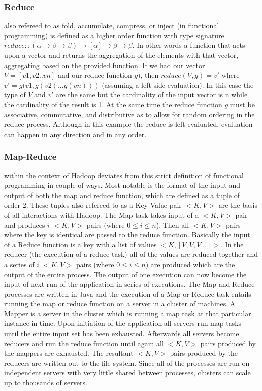 \documentclass[runningheads]{llncs}
\begin{document}
\subsubsection{Reduce}\label{•}  
also refereed to as fold, accumulate, compress, or inject (in functional programming) is defined as a higher order function with type signature $ reduce :: (\alpha \rightarrow \beta \rightarrow \beta) \rightarrow [\alpha] \rightarrow \beta \rightarrow \beta $. In other words a function that acts upon a vector and returns the aggregation of the elements with that vector, aggregating based on the provided function. If we had our vector $V = [v1,v2..vn]$ and our reduce function $g)$, then $reduce(V,g) = v'$ where $v'= g(v1,g(v2(...g(vn)))$ (assuming a left side evaluation). In this case the type of $V$ and $v’$ are the same but the cardinality of the input vector is n while the cardinality of the result is 1. At the same time the reduce function $g$ must be associative, commutative, and distributive as to allow for random ordering in the reduce process. Although in this  example the reduce is left evaluated, evaluation can happen in any direction and in any order.

\subsubsection{Map-Reduce}\label{•}
within the context of Hadoop deviates from this strict definition of functional programming in couple of ways. Most notable is the format of the input and output of both the map and reduce function, which are defined as a tuple of order 2. These tuples also refereed to as a Key Value pair $<K,V>$ are the basis of all interactions with Hadoop. The Map task takes input of a $<K,V>$ pair and produces $i$ $<K,V>$ pairs (where $ 0 \le i \le n $).
Then all $<K,V>$ pairs where the key is identical are passed to the reduce function. Basically the input of a Reduce function is a key with a list of values $<K,[V,V,V...]>$. In the reducer (the execution of a reduce task) all of the values are reduced together and a series of $i$ $<K,V>$ pairs (where $ 0 \le i \le n $) are produced which are the output of the entire process. The output of one execution can now become the input of next run of the application in series of executions. The Map and Reduce processes are written in Java and the execution of a Map or Reduce task entails running the map or reduce function on a server in a cluster of machines. A Mapper is a server in the cluster which is running a map task at that particular instance in time. Upon initiation of the application all servers run map tasks until the entire input set has been exhausted. Afterwards all servers become reducers and run the reduce function until again all $<K,V>$ pairs produced by the mappers are exhausted. The resultant $<K,V>$ pairs produced by the reducers are written out to the file system. Since all of the processes are run on independent servers with very little shared between processes, clusters can scale up to thousands of servers. 
\end{document}
